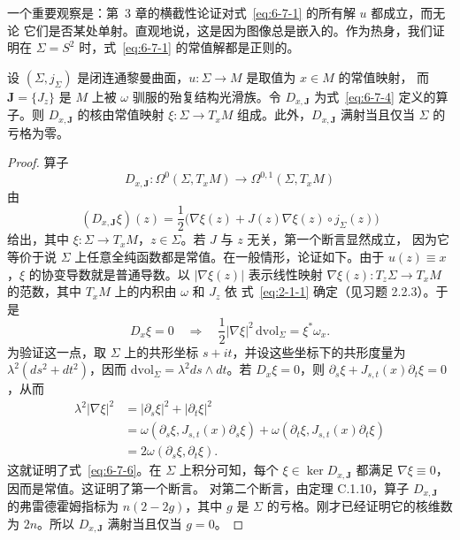 一个重要观察是：第~3 章的横截性论证对式~\eqref{eq:6-7-1} 的所有解 $u$ 都成立，而无论
它们是否某处单射。直观地说，这是因为图像总是嵌入的。作为热身，我们证明在
$\Sigma=S^2$ 时，式~\eqref{eq:6-7-1} 的常值解都是正则的。

\begin{lemma}\label{lem:6-7-6}
设 $(\Sigma,j_\Sigma)$ 是闭连通黎曼曲面，$u:\Sigma\to M$ 是取值为 $x\in M$ 的常值映射，
而 $\mathbf J=\{J_z\}$ 是 $M$ 上被 $\omega$ 驯服的殆复结构光滑族。令 $D_{x,\mathbf J}$
为式~\eqref{eq:6-7-4} 定义的算子。则 $D_{x,\mathbf J}$ 的核由常值映射
$\xi:\Sigma\to T_xM$ 组成。此外，$D_{x,\mathbf J}$ 满射当且仅当 $\Sigma$ 的亏格为零。
\end{lemma}

\begin{proof}
算子
\[
  D_{x,\mathbf J}:\Omega^0(\Sigma,T_xM)\longrightarrow\Omega^{0,1}(\Sigma,T_xM)
\]
由
\[
  (D_{x,\mathbf J}\xi)(z)
  =\frac12\bigl(\nabla\xi(z)+J(z)\nabla\xi(z)\circ j_\Sigma(z)\bigr)
\]
给出，其中 $\xi:\Sigma\to T_xM$，$z\in\Sigma$。若 $J$ 与 $z$ 无关，第一个断言显然成立，
因为它等价于说 $\Sigma$ 上任意全纯函数都是常值。在一般情形，论证如下。由于
$u(z)\equiv x$，$\xi$ 的协变导数就是普通导数。以 $|\nabla\xi(z)|$ 表示线性映射
$\nabla\xi(z):T_z\Sigma\to T_xM$ 的范数，其中 $T_xM$ 上的内积由 $\omega$ 和 $J_z$ 依
式~\eqref{eq:2-1-1} 确定（见习题 2.2.3）。于是
\begin{equation}\label{eq:6-7-6}
  D_x\xi=0
  \quad\Longrightarrow\quad
  \frac12|\nabla\xi|^2\,\mathrm{dvol}_\Sigma=\xi^*\omega_x.
\end{equation}
为验证这一点，取 $\Sigma$ 上的共形坐标 $s+it$，并设这些坐标下的共形度量为
$\lambda^2(ds^2+dt^2)$，因而
$\mathrm{dvol}_\Sigma=\lambda^2ds\wedge dt$。若 $D_x\xi=0$，则
$\partial_s\xi+J_{s,t}(x)\partial_t\xi=0$，从而
\begin{align*}
  \lambda^2|\nabla\xi|^2
  &=|\partial_s\xi|^2+|\partial_t\xi|^2\\
  &=\omega(\partial_s\xi,J_{s,t}(x)\partial_s\xi)
    +\omega(\partial_t\xi,J_{s,t}(x)\partial_t\xi)\\
  &=2\omega(\partial_s\xi,\partial_t\xi).
\end{align*}
这就证明了式~\eqref{eq:6-7-6}。在 $\Sigma$ 上积分可知，每个
$\xi\in\ker D_{x,\mathbf J}$ 都满足 $\nabla\xi\equiv0$，因而是常值。这证明了第一个断言。
对第二个断言，由定理 C.1.10，算子 $D_{x,\mathbf J}$ 的弗雷德霍姆指标为
$n(2-2g)$，其中 $g$ 是 $\Sigma$ 的亏格。刚才已经证明它的核维数为 $2n$。所以
$D_{x,\mathbf J}$ 满射当且仅当 $g=0$。
\end{proof}

